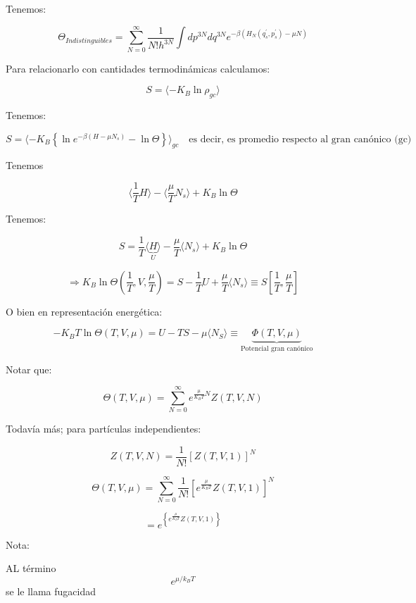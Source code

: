 \documentclass{article}
\begin{document}
Tenemos:


\[  \Theta_{Indistinguibles} = \sum\limits_{N=0}^{\infty} \frac{1}{N!h^{3N}} \int\limits dp^{3N} dq^{3N} e^{-\beta  (H_{N} (q^{\prime}_{s},  p^{\prime}_{s} ) - \mu N )  }    \]



Para relacionarlo con cantidades termodinámicas calculamos:



\[S = \langle -K_{B}\ln{ \rho_{gc} } \rangle  \]

Tenemos:


\[ S = \langle -K_{B} \left\{   \ln e^{ -\beta (H - \mu N_{s})  } - \ln \Theta \right\} \rangle_{gc} \quad\text{es decir, es promedio respecto al gran canónico (gc)}  \]


Tenemos

\[  \langle \frac{1}{T} H \rangle - \langle \frac{\mu}{T} N_{s} \rangle + K_{B}\ln \Theta   \]


Tenemos:


\[ S = \frac{1}{T} \langle \underbrace{H}_{U} \rangle - \frac{\mu}{T} \langle N_{s} \rangle + K_{B} \ln \Theta    \]


\[ \Rightarrow K_{B}\ln \Theta (\frac{1}{T}, V, \frac{\mu}{T}  ) = S - \frac{1}{T}U + \frac{\mu}{T} \langle N_{s}\rangle  \equiv S \left[ \frac{1}{T}, \frac{\mu}{T}  \right] \]



O bien en representación energética:



\[  -K_{B}T \ln \Theta (T,V,\mu) = U-TS - \mu \langle N_{S} \rangle \equiv \underbrace{\Phi (T,V,\mu)}_{\text{Potencial gran canónico}}  \]

Notar que:



\[ \Theta(T,V,\mu) = \sum\limits_{N=0}^{\infty} e^{ \frac{\mu  }{K_{B}T} N } Z(T,V,N)  \]

Todavía más; para partículas independientes:



\[ Z(T,V,N ) = \frac{1}{N!}  \left[ Z(T,V,1)   \right]^{N}  \]


\[ \Theta (T,V,\mu) = \sum\limits_{N=0}^{\infty} \frac{1}{N!} \left[  e^{\frac{\mu}{K_{B}T}  } Z(T,V,1)     \right]^{N}   \]


\[= e^{ \left\{  e^{  \frac{ \mu   }{K_{B}T}       } Z(T,V,1)        \right\}     }  \]

Nota:


AL término \[e^{\mu/k_{B}T}\] se le llama fugacidad
 
\end{document}
